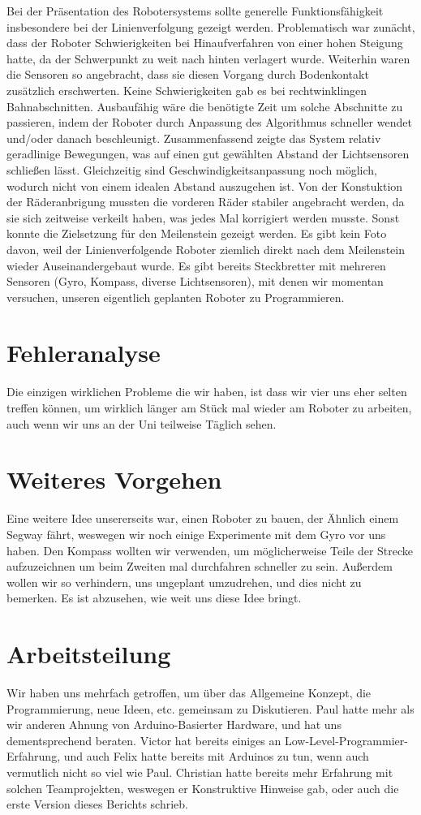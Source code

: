 \documentclass[11pt,a4paper]{article}
\begin{document}
Bei der Präsentation des Robotersystems sollte generelle Funktionsfähigkeit insbesondere bei der
Linienverfolgung gezeigt werden. Problematisch war zunächt, dass der Roboter Schwierigkeiten bei
Hinaufverfahren von einer hohen Steigung hatte, da der Schwerpunkt zu weit nach hinten verlagert 
wurde. Weiterhin waren die Sensoren so angebracht, dass sie diesen Vorgang durch Bodenkontakt 
zusätzlich erschwerten. Keine Schwierigkeiten gab es bei rechtwinklingen Bahnabschnitten. 
Ausbaufähig wäre die benötigte Zeit um solche Abschnitte zu passieren, indem der Roboter durch 
Anpassung des Algorithmus schneller wendet und/oder danach beschleunigt. Zusammenfassend zeigte 
das System relativ geradlinige Bewegungen, was auf einen gut gewählten Abstand der Lichtsensoren
schließen lässt. Gleichzeitig sind Geschwindigkeitsanpassung noch möglich, wodurch nicht von einem 
idealen Abstand auszugehen ist. Von der Konstuktion der Räderanbrigung mussten die vorderen Räder 
stabiler angebracht werden, da sie sich zeitweise verkeilt haben, was jedes Mal korrigiert werden
musste. Sonst konnte die Zielsetzung für den Meilenstein gezeigt werden. Es gibt kein Foto davon,
weil der Linienverfolgende Roboter ziemlich direkt nach dem Meilenstein wieder Auseinandergebaut
wurde. Es gibt bereits Steckbretter mit mehreren Sensoren (Gyro, Kompass, diverse Lichtsensoren),
mit denen wir momentan versuchen, unseren eigentlich geplanten Roboter zu Programmieren.

\section{Fehleranalyse}
Die einzigen wirklichen Probleme die wir haben, ist dass wir vier uns eher selten treffen können,
um wirklich länger am Stück mal wieder am Roboter zu arbeiten, auch wenn wir uns an der Uni
teilweise Täglich sehen.

\section{Weiteres Vorgehen}

Eine weitere Idee unsererseits war, einen Roboter zu bauen, der Ähnlich einem Segway fährt,
weswegen wir noch einige Experimente mit dem Gyro vor uns haben. Den Kompass wollten wir verwenden,
um möglicherweise Teile der Strecke aufzuzeichnen um beim Zweiten mal durchfahren schneller zu sein.
Außerdem wollen wir so verhindern, uns ungeplant umzudrehen, und dies nicht zu bemerken.
Es ist abzusehen, wie weit uns diese Idee bringt.

\section{Arbeitsteilung}
Wir haben uns mehrfach getroffen, um über das Allgemeine Konzept, die Programmierung, neue Ideen,
etc. gemeinsam zu Diskutieren. Paul hatte mehr als wir anderen Ahnung von Arduino-Basierter 
Hardware, und hat uns dementsprechend beraten. Victor hat bereits einiges an 
Low-Level-Programmier-Erfahrung, und auch Felix hatte bereits mit Arduinos zu tun, wenn auch 
vermutlich nicht so viel wie Paul. Christian hatte bereits mehr Erfahrung mit solchen 
Teamprojekten, weswegen er Konstruktive Hinweise gab, oder auch die erste Version dieses 
Berichts schrieb.
\end{document}
